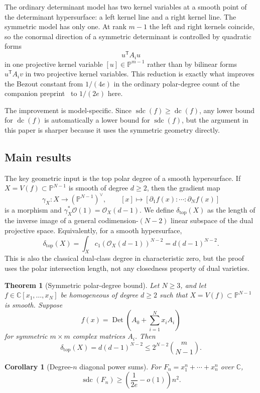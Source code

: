 \documentclass[11pt]{article}
\theoremstyle{plain}
\newtheorem{theorem}{Theorem}
\newtheorem{corollary}{Corollary}
\theoremstyle{definition}
\DeclareMathOperator{\sdc}{sdc}
\DeclareMathOperator{\dc}{dc}
\DeclareMathOperator{\Det}{Det}
\newcommand{\PP}{\mathbb{P}}
\newcommand{\CC}{\mathbb{C}}
\newcommand{\OO}{\mathcal O}
\newcommand{\pdeg}{\delta}
\begin{document}
The ordinary determinant model has two kernel variables at a smooth point of
the determinant hypersurface: a left kernel line and a right kernel line.  The
symmetric model has only one.  At rank $m-1$ the left and right kernels coincide,
so the conormal direction of a symmetric determinant is controlled by quadratic
forms
\[
  u^{\mathsf T}A_i u
\]
in one projective kernel variable $[u]\in\PP^{m-1}$ rather than by bilinear
forms $u^{\mathsf T}A_i v$ in two projective kernel variables.  This reduction
is exactly what improves the Bezout constant from $1/(4e)$ in the ordinary
polar-degree count of the companion preprint~\cite{SheshadriArxiv} to
$1/(2e)$ here.

The improvement is model-specific.  Since $\sdc(f)\ge \dc(f)$, any lower bound
for $\dc(f)$ is automatically a lower bound for $\sdc(f)$, but the argument in
this paper is sharper because it uses the symmetric geometry directly.

\subsection{Main results}

The key geometric input is the top polar degree of a smooth hypersurface.  If
$X=V(f)\subset\PP^{N-1}$ is smooth of degree $d\ge2$, then the gradient map
\[
  \gamma_X:X\longrightarrow (\PP^{N-1})^\vee,
  \qquad
  [x]\longmapsto [\partial_1f(x):\cdots:\partial_N f(x)]
\]
is a morphism and $\gamma_X^*\OO(1)=\OO_X(d-1)$.  We define
$\pdeg_{\mathrm{top}}(X)$ as the length of the inverse image of a general
codimension-$(N-2)$ linear subspace of the dual projective space.  Equivalently,
for a smooth hypersurface,
\[
  \pdeg_{\mathrm{top}}(X)=\int_X c_1(\OO_X(d-1))^{N-2}=d(d-1)^{N-2}.
\]
This is also the classical dual-class degree in characteristic zero, but the
proof uses the polar intersection length, not any closedness property of dual
varieties.

\begin{theorem}[Symmetric polar-degree bound]
\label{thm:main}
Let $N\ge3$, and let $f\in\CC[x_1,\ldots,x_N]$ be homogeneous of degree
$d\ge2$ such that $X=V(f)\subset\PP^{N-1}$ is smooth.  Suppose
\[
  f(x)=\Det\!\left(A_0+\sum_{i=1}^N x_iA_i\right)
\]
for symmetric $m\times m$ complex matrices $A_i$.  Then
\[
  \pdeg_{\mathrm{top}}(X)=d(d-1)^{N-2}
  \le 2^{N-2}\binom{m}{N-1}.
\]
\end{theorem}


\begin{corollary}[Degree-$n$ diagonal power sums]
\label{cor:fermat}
For $F_n=x_1^n+\cdots+x_n^n$ over $\CC$,
\[
  \sdc(F_n)\ge \left(\frac{1}{2e}-o(1)\right)n^2.
\]
\end{corollary}
\end{document}
